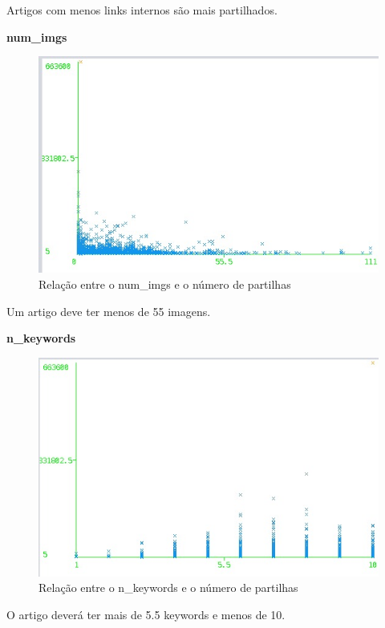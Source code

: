 Artigos com menos links internos são mais partilhados.

\textbf{num\_imgs}

\begin{figure}[H]
    \centering
    \includegraphics[scale=0.6]{tex/img/graph5.jpg}
    \caption{Relação entre o num\_imgs e o número de partilhas}
    \label{fig:numImgs}
\end{figure}

Um artigo deve ter menos de 55 imagens.

\textbf{n\_keywords}

\begin{figure}[H]
    \centering
    \includegraphics[scale=0.6]{tex/img/graph6.jpg}
    \caption{Relação entre o n\_keywords e o número de partilhas}
    \label{fig:nKeywords}
\end{figure}

O artigo deverá ter mais de 5.5 keywords e menos de 10.

